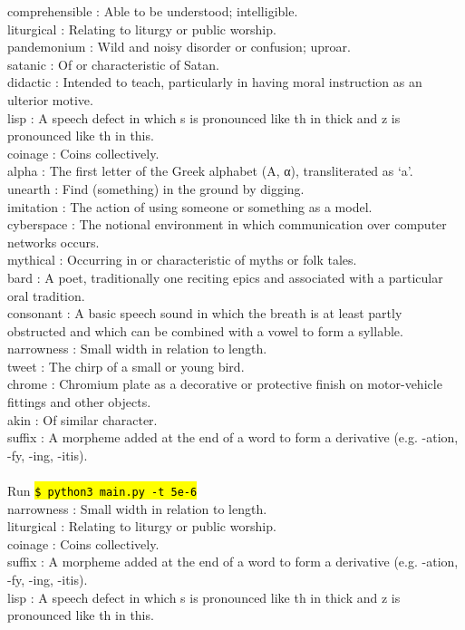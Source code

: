 \documentclass[12pt]{article}
\newcommand{\hltexttt}[1]{\texttt{\hl{#1}}}
\begin{document}
\noindent comprehensible :  Able to be understood; intelligible.\\
liturgical :  Relating to liturgy or public worship.\\
pandemonium :  Wild and noisy disorder or confusion; uproar.\\
satanic :  Of or characteristic of Satan.\\
didactic :  Intended to teach, particularly in having moral instruction as an ulterior motive.\\
lisp :  A speech defect in which s is pronounced like th in thick and z is pronounced like th in this.\\
coinage :  Coins collectively.\\
alpha :  The first letter of the Greek alphabet (Α, α), transliterated as ‘a’.\\
unearth :  Find (something) in the ground by digging.\\
imitation :  The action of using someone or something as a model.\\
cyberspace :  The notional environment in which communication over computer networks occurs.\\
mythical :  Occurring in or characteristic of myths or folk tales.\\
bard :  A poet, traditionally one reciting epics and associated with a particular oral tradition.\\
consonant :  A basic speech sound in which the breath is at least partly obstructed and which can be combined with a vowel to form a syllable.\\
narrowness :  Small width in relation to length.\\
tweet :  The chirp of a small or young bird.\\
chrome :  Chromium plate as a decorative or protective finish on motor-vehicle fittings and other objects.\\
akin :  Of similar character.\\
suffix :  A morpheme added at the end of a word to form a derivative (e.g. -ation, -fy, -ing, -itis).\\
\\

\noindent Run \hltexttt{\$ python3 main.py -t 5e-6}\\

\noindent narrowness :  Small width in relation to length.\\
liturgical :  Relating to liturgy or public worship.\\
coinage :  Coins collectively.\\
suffix :  A morpheme added at the end of a word to form a derivative (e.g. -ation, -fy, -ing, -itis).\\
lisp :  A speech defect in which s is pronounced like th in thick and z is pronounced like th in this.\\
 
\end{document}
